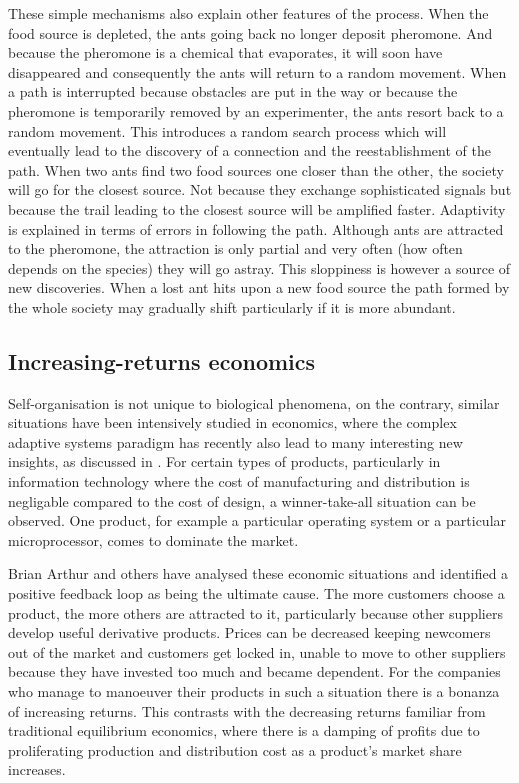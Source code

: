 These simple mechanisms also explain other features of the process. 
When the food source is depleted, the ants going 
back no longer deposit pheromone. And because the pheromone is 
a chemical that evaporates, it will soon have disappeared and consequently 
the ants will return to a random movement. When a path 
is interrupted because obstacles
are put in the way or because the pheromone is temporarily removed by 
an experimenter, the ants resort back to a random movement. This introduces
a random search process 
which will eventually lead to the discovery of a connection and the 
reestablishment of the path. When two ants find two food sources one closer
than the other, the society will go for the closest source. Not because they 
exchange sophisticated signals but because the trail leading to the 
closest source will be amplified faster. Adaptivity is explained in 
terms of errors in following the path. Although ants are attracted 
to the pheromone, the attraction is only partial and 
very often (how often depends on the species)
they will go astray. This sloppiness is however a source of new discoveries. 
When a lost ant hits upon a new food source
the path formed by the whole society may gradually shift
particularly if it is more abundant.

\subsection{Increasing-returns economics}

Self-organisation is not unique to biological phenomena,
on the contrary, similar situations have been intensively
studied in economics, where
the complex adaptive systems paradigm has recently also 
lead to many interesting new insights, as discussed in \cite{Arthur:1996}. 
For certain types of products, particularly in 
information technology where the cost of manufacturing 
and distribution is negligable compared to the cost
of design, a winner-take-all situation can be observed. 
One product, for example a particular operating system or 
a particular microprocessor, comes to dominate the market. 

Brian Arthur and others have analysed these economic situations 
and identified a positive feedback loop as being the ultimate cause.
The more customers choose a product, the more 
others are attracted to it, particularly because 
other suppliers develop useful derivative products. Prices can 
be decreased keeping newcomers out of the market and 
customers get locked in, unable to move to other suppliers
because they have invested too much and became dependent. 
For the companies who manage to manoeuver their products
in such a situation there is a bonanza of increasing returns. 
This contrasts with the decreasing returns familiar 
from traditional equilibrium economics, where there is 
a damping of profits due to proliferating production and 
distribution cost as a product's market share increases. 

